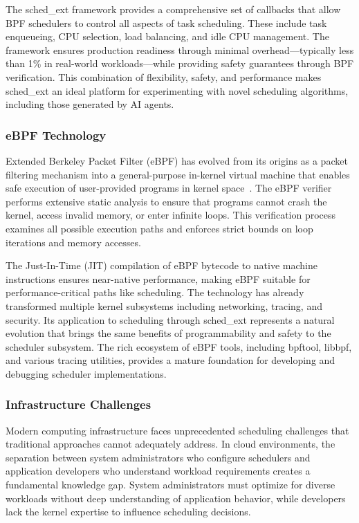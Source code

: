 The sched\_ext framework provides a comprehensive set of callbacks that allow BPF schedulers to control all aspects of task scheduling. These include task enqueueing, CPU selection, load balancing, and idle CPU management. The framework ensures production readiness through minimal overhead—typically less than 1\% in real-world workloads—while providing safety guarantees through BPF verification. This combination of flexibility, safety, and performance makes sched\_ext an ideal platform for experimenting with novel scheduling algorithms, including those generated by AI agents.

\subsubsection{eBPF Technology}

Extended Berkeley Packet Filter (eBPF) has evolved from its origins as a packet filtering mechanism into a general-purpose in-kernel virtual machine that enables safe execution of user-provided programs in kernel space~\cite{mccanne1993bpf,gregg2019bpf}. The eBPF verifier performs extensive static analysis to ensure that programs cannot crash the kernel, access invalid memory, or enter infinite loops. This verification process examines all possible execution paths and enforces strict bounds on loop iterations and memory accesses.

The Just-In-Time (JIT) compilation of eBPF bytecode to native machine instructions ensures near-native performance, making eBPF suitable for performance-critical paths like scheduling. The technology has already transformed multiple kernel subsystems including networking, tracing, and security. Its application to scheduling through sched\_ext represents a natural evolution that brings the same benefits of programmability and safety to the scheduler subsystem. The rich ecosystem of eBPF tools, including bpftool, libbpf, and various tracing utilities, provides a mature foundation for developing and debugging scheduler implementations.

\subsubsection{Infrastructure Challenges}

Modern computing infrastructure faces unprecedented scheduling challenges that traditional approaches cannot adequately address. In cloud environments, the separation between system administrators who configure schedulers and application developers who understand workload requirements creates a fundamental knowledge gap. System administrators must optimize for diverse workloads without deep understanding of application behavior, while developers lack the kernel expertise to influence scheduling decisions.

